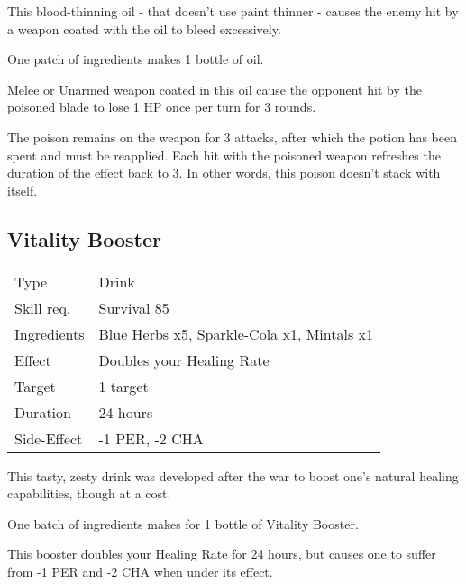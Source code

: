 \documentclass[11pt,a4paper,twocolumn]{book}
\begin{document}
\medskip

This blood-thinning oil - that doesn't use paint thinner - causes the enemy hit by a weapon coated with the oil to bleed excessively.

One patch of ingredients makes 1 bottle of oil.

Melee or Unarmed weapon coated in this oil cause the opponent hit by the poisoned blade to lose 1 HP once per turn for 3 rounds.

The poison remains on the weapon for 3 attacks, after which the potion has been spent and must be reapplied. Each hit with the poisoned weapon refreshes the duration of the effect back to 3. In other words, this poison doesn't stack with itself.

\vfill

\subsection*{Vitality Booster}
{
	\begin{tabu} to 75mm{| X[l,4] | X[l,8] |}
		\hline
		Type 			& Drink 													\\
		Skill req.	    & Survival 85 												\\
		Ingredients     & Blue Herbs x5, Sparkle-Cola x1, Mintals x1				\\
		Effect     		& Doubles your Healing Rate 								\\
		Target      	& 1 target													\\
		Duration  		& 24 hours	 												\\
		Side-Effect     & -1 PER, -2 CHA											\\ \hline
	\end{tabu}
	
}

\medskip

This tasty, zesty drink was developed after the war to boost one's natural healing capabilities, though at a cost.

One batch of ingredients makes for 1 bottle of Vitality Booster.

This booster doubles your Healing Rate for 24 hours, but causes one to suffer from -1 PER and -2 CHA when under its effect.
\end{document}
